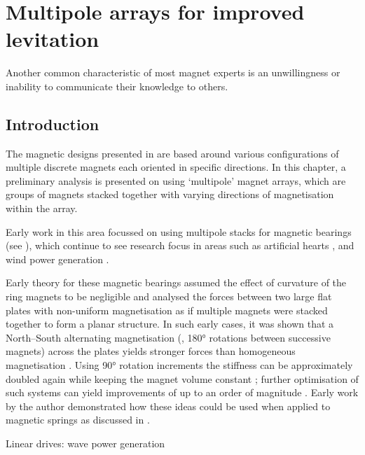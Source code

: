 \documentclass[11pt,a4paper]{memoir}
\begin{document}
\chapter{Multipole arrays for improved levitation}

\epigraph{Another common characteristic of most magnet experts is an unwillingness or inability to communicate their knowledge to others.}{\textcite{moskowitz1995}}


\section{Introduction}

The magnetic designs presented in  are based around various configurations of multiple discrete magnets each oriented in specific directions.
In this chapter, a preliminary analysis is presented on using `multipole' magnet arrays, which are groups of magnets stacked together with varying directions of magnetisation within the array.

Early work in this area focussed on using multipole stacks for magnetic bearings (see ), which continue to see research focus in areas such as artificial hearts \parencite{chen2002,finocchiaro2008,samiappan2008}, and wind power generation \parencite{liu2008-ietm}.

Early theory for these magnetic bearings assumed the effect of curvature of the ring magnets to be negligible and analysed the forces between two large flat plates with non-uniform magnetisation as if multiple magnets were stacked together to form a planar structure.
In such early cases, it was shown that a North--South alternating magnetisation (\ie, \ang{180} rotations between successive magnets) across the plates yields stronger forces than homogeneous magnetisation \cite{backers1961}.
Using \ang{90} rotation increments the stiffness can be approximately doubled again while keeping the magnet volume constant \cite{yonnet1991}; further optimisation of such systems can yield improvements of up to an order of magnitude \cite{moser2006}.
Early work by the author demonstrated how these ideas could be used when applied to magnetic springs as discussed in  \cite{robertson2005-ietm}.

Linear drives: wave power generation \parencite{kimoulakis2008}
\end{document}
